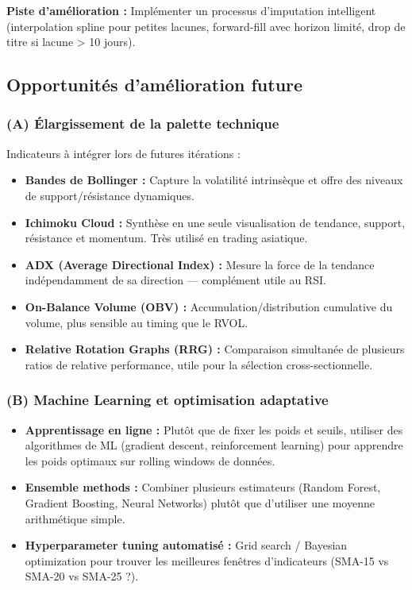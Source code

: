 \documentclass{rapportENSIAS} %
\begin{document}
\vspace{0.2cm}
\noindent
\textbf{Piste d'amélioration :} Implémenter un processus d'imputation intelligent (interpolation spline pour petites lacunes, forward-fill avec horizon limité, drop de titre si lacune > 10 jours).

\subsection{Opportunités d'amélioration future}

\noindent
\subsubsection*{(A) Élargissement de la palette technique}

\noindent
Indicateurs à intégrer lors de futures itérations :
\begin{itemize}
    \item \textbf{Bandes de Bollinger :} Capture la volatilité intrinsèque et offre des niveaux de support/résistance dynamiques.
    \item \textbf{Ichimoku Cloud :} Synthèse en une seule visualisation de tendance, support, résistance et momentum. Très utilisé en trading asiatique.
    \item \textbf{ADX (Average Directional Index) :} Mesure la force de la tendance indépendamment de sa direction — complément utile au RSI.
    \item \textbf{On-Balance Volume (OBV) :} Accumulation/distribution cumulative du volume, plus sensible au timing que le RVOL.
    \item \textbf{Relative Rotation Graphs (RRG) :} Comparaison simultanée de plusieurs ratios de relative performance, utile pour la sélection cross-sectionnelle.
\end{itemize}

\subsubsection*{(B) Machine Learning et optimisation adaptative}

\noindent
\begin{itemize}
    \item \textbf{Apprentissage en ligne :} Plutôt que de fixer les poids et seuils, utiliser des algorithmes de ML (gradient descent, reinforcement learning) pour apprendre les poids optimaux sur rolling windows de données.
    \item \textbf{Ensemble methods :} Combiner plusieurs estimateurs (Random Forest, Gradient Boosting, Neural Networks) plutôt que d'utiliser une moyenne arithmétique simple.
    \item \textbf{Hyperparameter tuning automatisé :} Grid search / Bayesian optimization pour trouver les meilleures fenêtres d'indicateurs (SMA-15 vs SMA-20 vs SMA-25 ?).
\end{itemize}
\end{document}
